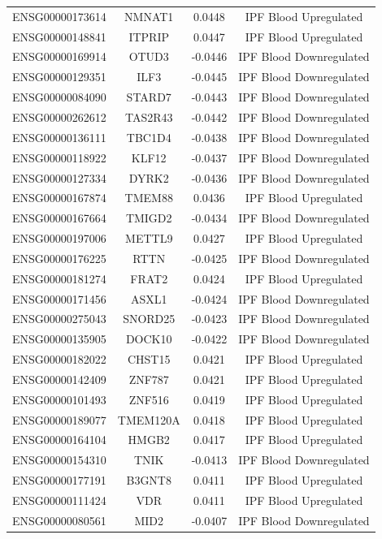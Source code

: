 \documentclass[
]{article}
\begin{document}
\begin{singlespace}
\begin{longtable}[t]{lccc}
ENSG00000173614 & NMNAT1 & 0.0448 & IPF Blood Upregulated\\
ENSG00000148841 & ITPRIP & 0.0447 & IPF Blood Upregulated\\
ENSG00000169914 & OTUD3 & -0.0446 & IPF Blood Downregulated\\
\addlinespace
ENSG00000129351 & ILF3 & -0.0445 & IPF Blood Downregulated\\
ENSG00000084090 & STARD7 & -0.0443 & IPF Blood Downregulated\\
ENSG00000262612 & TAS2R43 & -0.0442 & IPF Blood Downregulated\\
ENSG00000136111 & TBC1D4 & -0.0438 & IPF Blood Downregulated\\
ENSG00000118922 & KLF12 & -0.0437 & IPF Blood Downregulated\\
\addlinespace
ENSG00000127334 & DYRK2 & -0.0436 & IPF Blood Downregulated\\
ENSG00000167874 & TMEM88 & 0.0436 & IPF Blood Upregulated\\
ENSG00000167664 & TMIGD2 & -0.0434 & IPF Blood Downregulated\\
ENSG00000197006 & METTL9 & 0.0427 & IPF Blood Upregulated\\
ENSG00000176225 & RTTN & -0.0425 & IPF Blood Downregulated\\
\addlinespace
ENSG00000181274 & FRAT2 & 0.0424 & IPF Blood Upregulated\\
ENSG00000171456 & ASXL1 & -0.0424 & IPF Blood Downregulated\\
ENSG00000275043 & SNORD25 & -0.0423 & IPF Blood Downregulated\\
ENSG00000135905 & DOCK10 & -0.0422 & IPF Blood Downregulated\\
ENSG00000182022 & CHST15 & 0.0421 & IPF Blood Upregulated\\
\addlinespace
ENSG00000142409 & ZNF787 & 0.0421 & IPF Blood Upregulated\\
ENSG00000101493 & ZNF516 & 0.0419 & IPF Blood Upregulated\\
ENSG00000189077 & TMEM120A & 0.0418 & IPF Blood Upregulated\\
ENSG00000164104 & HMGB2 & 0.0417 & IPF Blood Upregulated\\
ENSG00000154310 & TNIK & -0.0413 & IPF Blood Downregulated\\
\addlinespace
ENSG00000177191 & B3GNT8 & 0.0411 & IPF Blood Upregulated\\
ENSG00000111424 & VDR & 0.0411 & IPF Blood Upregulated\\
ENSG00000080561 & MID2 & -0.0407 & IPF Blood Downregulated\\

\end{longtable}
\end{singlespace}
\end{document}
